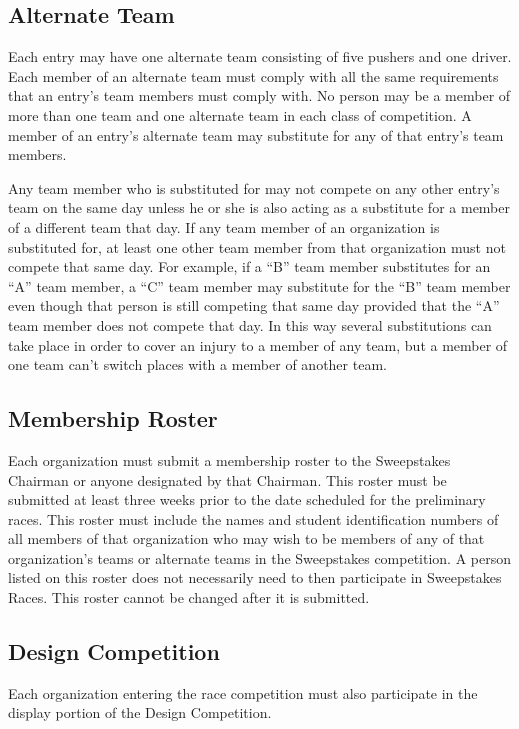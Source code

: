 \documentclass[openany]{book}
\begin{document}
\subsection{Alternate Team}
Each entry may have one alternate team consisting of five pushers and one driver. Each member of an alternate team must comply with all the same requirements that an entry's team members must comply with. No person may be a member of more than one team and one alternate team in each class of competition. A member of an entry's alternate team may substitute for any of that entry's team members.

Any team member who is substituted for may not compete on any other entry's team on the same day unless he or she is also acting as a substitute for a member of a different team that day. If any team member of an organization is substituted for, at least one other team member from that organization must not compete that same day. For example, if a ``B'' team member substitutes for an ``A'' team member, a ``C'' team member may substitute for the ``B'' team member even though that person is still competing that same day provided that the ``A'' team member does not compete that day. In this way several substitutions can take place in order to cover an injury to a member of any team, but a member of one team can't switch places with a member of another team.

\subsection{Membership Roster}
Each organization must submit a membership roster to the Sweepstakes Chairman or anyone designated by that Chairman. This roster must be submitted at least three weeks prior to the date scheduled for the preliminary races. This roster must include the names and student identification numbers of all members of that organization who may wish to be members of any of that organization's teams or alternate teams in the Sweepstakes competition. A person listed on this roster does not necessarily need to then participate in Sweepstakes Races. This roster cannot be changed after it is submitted.

\subsection{Design Competition}
Each organization entering the race competition must also participate in the display portion of the Design Competition.
\end{document}
